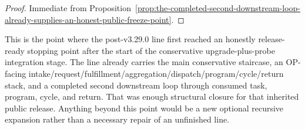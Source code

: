 \begin{proof}
Immediate from Proposition~\ref{prop:the-completed-second-downstream-loop-already-supplies-an-honest-public-freeze-point}.
\end{proof}

\begin{remark}
\label{rem:what-the-release-freeze-stabilization-point-now-buys}
This is the point where the post-v3.29.0 line first reached an honestly release-ready stopping point after the start of the conservative upgrade-plus-probe integration stage. The line already carries the main conservative staircase, an OP-facing intake/request/fulfillment/aggregation/dispatch/program/cycle/return stack, and a completed second downstream loop through consumed task, program, cycle, and return. That was enough structural closure for that inherited public release. Anything beyond this point would be a new optional recursive expansion rather than a necessary repair of an unfinished line.
\end{remark}

\clearpage

